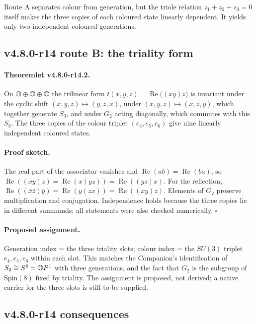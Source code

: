 Route A separates colour from generation, but the triole relation \(z_1+z_2+z_3=0\) itself makes the three
copies of each coloured state linearly dependent.  It yields only two independent coloured generations.

\subsection*{v4.8.0-r14 route B: the triality form}
\label{subsec:v480-r14-triality}

\paragraph{Theoremlet v4.8.0-r14.2.}
On \(\mathbb{O}\oplus\mathbb{O}\oplus\mathbb{O}\) the trilinear form \(t(x,y,z)=\operatorname{Re}\bigl((xy)z\bigr)\) is invariant under the
cyclic shift \((x,y,z)\mapsto(y,z,x)\), under \((x,y,z)\mapsto(\bar x,\bar z,\bar y)\), which together generate
\(S_3\), and under \(G_2\) acting diagonally, which commutes with this \(S_3\).  The three copies of the colour
triplet \((e_4,e_5,e_6)\) give nine linearly independent coloured states.

\paragraph{Proof sketch.}
The real part of the associator vanishes and \(\operatorname{Re}(ab)=\operatorname{Re}(ba)\), so
\(\operatorname{Re}((xy)z)=\operatorname{Re}(x(yz))=\operatorname{Re}((yz)x)\).  For the reflection,
\(\operatorname{Re}((\bar x\bar z)\bar y)=\operatorname{Re}(y(zx))=\operatorname{Re}((xy)z)\).  Elements of
\(G_2\) preserve multiplication and conjugation.  Independence holds because the three copies lie in different
summands; all statements were also checked numerically.  \(\square\)

\paragraph{Proposed assignment.}
Generation index = the three triality slots; colour index = the \(SU(3)\) triplet \(e_4,e_5,e_6\) within each
slot.  This matches the Companion's identification of \(S_2\cong S^8=\mathbb{O} P^1\) with three generations, and the
fact that \(G_2\) is the subgroup of \(\mathrm{Spin}(8)\) fixed by triality.  The assignment is proposed, not
derived; a native carrier for the three slots is still to be supplied.

\subsection*{v4.8.0-r14 consequences}
\label{subsec:v480-r14-consequences}

